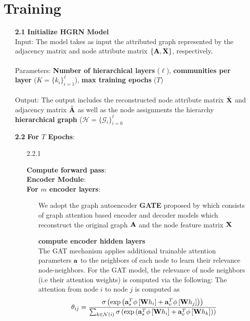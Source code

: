 \documentclass[a4paper,12pt]{article}
\newcommand{\forceindent}{\leavevmode{\parindent=2em\indent}}
\begin{document}
	\section{Training}
	\begin{itemize}
	\item[\bf 2.1]{\textbf{Initialize HGRN Model} \\
		Input: The model takes as input the attributed graph represented by the adjacency matrix and node attribute matrix $\{{\bf A}, {\bf X}\}$, respectively. \\
		\\
		Parameters: \textbf{Number of hierarchical layers} ($\ell$), \textbf{communities per layer} ($K =\{k_i\}_{i=1}^\ell$), \textbf{max training epochs} ($T$) \\
		\\
		Output: The output includes the reconstructed node attribute matrix $\hat{\bf X}$ and adjacency matrix $\hat{\bf A}$ as well as the node assignments the hierarchy \textbf{hierarchical graph} ($\mathcal{H} = \{\mathcal{G}_i\}_{i = 0}^\ell$
	}

	\item[\bf 2.2]{\textbf{For $T$ Epochs}:}
		\begin{enumerate}
			\item[2.2.1]{\textbf{Compute forward pass}: \\
			
			 \forceindent \textbf{Encoder Module}: \\
			 \forceindent \textbf{For $m$ encoder layers}: 
			\begin{enumerate}
				\item[]{We adopt the graph autoencoder \textbf{GATE} proposed by \cite{salehi2019graph} which consists of graph attention based encoder and decoder models which reconstruct the original graph ${\bf A}$ and the node feature matrix $\bf{X}$}
				\item[]{\textbf{compute encoder hidden layers} \\
					The GAT mechanism applies additional trainable attention parameters ${\bf a}$ to the neighbors of each node to learn their relevance node-neighbors. For the GAT model, the relevance of node neighbors (i.e their attention weights) is computed via the following:
					The attention from node $i$ to node $j$ is computed as 
					\[ \theta_{ij} = \frac{\sigma\left(\exp\left({\bf a}_s^T\phi\left[{\bf W}h_i\right]+{\bf a}_v^T\phi\left[{\bf W}h_j \right]\right)\right)}
					{\sum_{k\in \mathcal{N}(i)}\sigma\left(\exp\left({\bf a}_s^T\phi\left[{\bf W}h_i\right]+{\bf a}_v^T\phi\left[{\bf W}h_k \right]\right)\right)} \]
					
}
\end{enumerate}}
\end{enumerate}
\end{itemize}
\end{document}
